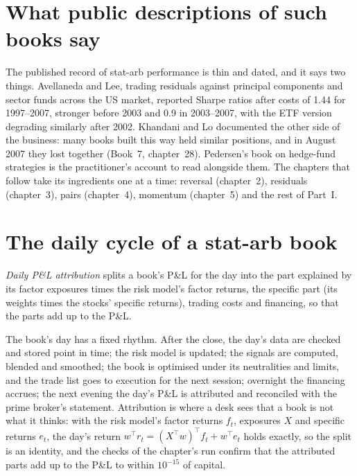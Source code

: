 \section{What public descriptions of such books say}

The published record of stat-arb performance is thin and dated, and it says two things. Avellaneda and Lee, trading residuals against principal components and
sector funds across the US market, reported Sharpe ratios after costs of 1.44 for 1997--2007, stronger before 2003 and 0.9 in 2003--2007, with the ETF version
degrading similarly after 2002. Khandani and Lo documented the other side of the business: many books built this way held similar positions, and in August 2007
they lost together (Book~7, chapter~28). Pedersen's book on hedge-fund strategies is the practitioner's account to read alongside them. The chapters that follow take its ingredients one at a time: reversal
(chapter~2), residuals (chapter~3), pairs (chapter~4), momentum (chapter~5) and the rest of Part~I.

\section{The daily cycle of a stat-arb book}

\begin{definition}\label{def:s1:anatomy-of-a-stat-arb-book:attribution}
\emph{Daily P\&L attribution} splits a book's P\&L for the day into the part explained by its factor exposures times the risk
model's factor returns, the specific part (its weights times the stocks' specific returns), trading costs and financing, so that the parts add up to the P\&L.
\end{definition}

The book's day has a fixed rhythm. After the close, the day's data are checked and stored point in time; the risk model is updated; the signals are computed,
blended and smoothed; the book is optimised under its neutralities and limits, and the trade list goes to execution for the next session; overnight the financing
accrues; the next evening the day's P\&L is attributed and reconciled with the prime broker's statement. Attribution is where a desk sees that a book is not what it
thinks: with the risk model's factor returns $f_t$, exposures $X$ and specific returns $e_t$, the day's return $w^\top r_t = (X^\top w)^\top f_t + w^\top e_t$ holds
exactly, so the split is an identity, and the checks of the chapter's run confirm that the attributed parts add up to the P\&L to within $10^{-15}$ of capital.

